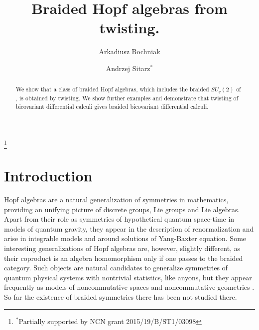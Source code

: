\documentclass[12pt]{amsart}
\theoremstyle{definition}
\numberwithin{equation}{section}
\begin{document}
 
\title{Braided Hopf algebras from twisting.} 
\author[A.\ Bochniak]{Arkadiusz Bochniak}
\address{Institute of Physics, Jagiellonian University,
prof.\ Stanis\l awa \L ojasiewicza 11, 30-348 Krak\'ow, Poland \newline\indent
Copernicus Center for Interdisciplinary Studies, Szczepańska 1/5, 31-011 Kraków, Poland}

\author[A.\ Sitarz]{Andrzej Sitarz${}^*$} 
\address{Institute of Physics, Jagiellonian University,
prof.\ Stanis\l awa \L ojasiewicza 11, 30-348 Krak\'ow, Poland.\newline\indent
 Institute of Mathematics of the Polish Academy of Sciences,
\'Sniadeckich 8, 00-656 Warszawa, Poland.}
\thanks{${}^*$Partially supported by NCN grant 2015/19/B/ST1/03098}
\begin{abstract} 
We show that a class of braided Hopf algebras, which includes the braided $SU_q(2)$ of 
\cite{KMRW14}, is obtained by twisting. We show further examples and demonstrate that 
twisting of bicovariant differential calculi gives braided bicovariant differential 
calculi.
\end{abstract} 
\maketitle 
\section{Introduction}

Hopf algebras are a natural generalization of symmetries in mathematics, providing an unifying
picture of discrete groups, Lie groups and Lie algebras. Apart from their role as symmetries of
hypothetical quantum space-time in models of quantum gravity, they appear in the description
of renormalization and arise in integrable models and around solutions of Yang-Baxter equation.
Some interesting generalizations of Hopf algebras are, however, slightly different, as their
coproduct is an algebra homomorphism only if one passes to the braided category. Such objects are
natural candidates to generalize symmetries of quantum physical systems with nontrivial 
statistics, like anyons, but they appear frequently as models of noncommutative spaces and
noncommutative geometries \cite{CoLa}. So far the existence of braided symmetries there has 
been not studied there.
 
\end{document}
